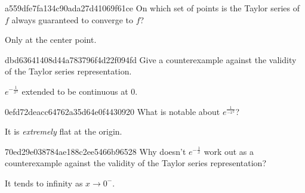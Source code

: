 \begin{note}{a559dfe7fa134c90ada27d41069f61ce}
    On which set of points is the Taylor series of \({ f }\) always guaranteed to converge to \({ f }\)?

    \begin{cloze}{1}
        Only at the center point.
    \end{cloze}
\end{note}

\begin{note}{dbd63641408d44a783796f4d22f094fd}
    Give a counterexample against the validity of the Taylor series representation.

    \begin{cloze}{1}
        \({ e^{-\frac{1}{x^2}} }\) extended to be continuous at \({ 0 }\).
    \end{cloze}
\end{note}

\begin{note}{0efd72deacc64762a35d64e0f4430920}
    What is notable about \({ e^{\frac{1}{-x^2}} }\)?

    \begin{cloze}{1}
        It is \textit{extremely} flat at the origin.
    \end{cloze}
\end{note}

\begin{note}{70ed29e038784ae188c2ee5466b96528}
    Why doesn't \({ e^{-\frac{1}{x}} }\) work out as a counterexample against the validity of the Taylor series representation?

    \begin{cloze}{1}
        It tends to infinity as \({ x \to 0^{-} }\).
    \end{cloze}
\end{note}


